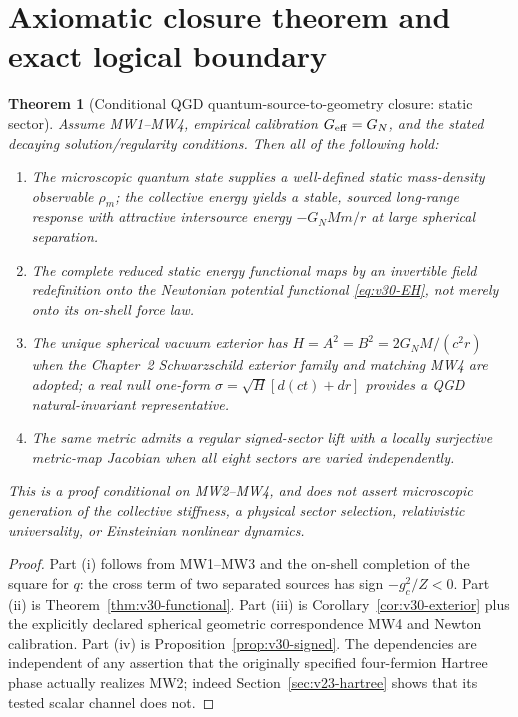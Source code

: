 \documentclass[11pt,a4paper]{article}
\newtheorem{theorem}{Theorem}[section]
\theoremstyle{remark}\newtheorem{remark}[theorem]{Remark}
\begin{document}
\section{Axiomatic closure theorem and exact logical boundary}\label{sec:v30-closure}
\begin{theorem}[Conditional QGD quantum-source-to-geometry closure: static sector]\label{thm:v30-closure}
Assume MW1--MW4, empirical calibration $G_{\rm eff}=G_N$, and the stated decaying solution/regularity conditions. Then all of the following hold:\par
\begin{enumerate}[label=(\roman*)]
\item The microscopic quantum state supplies a well-defined static mass-density observable $\rho_m$; the collective energy yields a stable, sourced long-range response with attractive intersource energy $-G_NMm/r$ at large spherical separation.
\item The complete reduced static energy functional maps by an invertible field redefinition onto the Newtonian potential functional \eqref{eq:v30-EH}, not merely onto its on-shell force law.
\item The unique spherical vacuum exterior has $H=A^2=B^2=2G_NM/(c^2r)$ \emph{when the Chapter~2 Schwarzschild exterior family and matching MW4 are adopted}; a real null one-form $\sigma=\sqrt H[d(ct)+dr]$ provides a QGD natural-invariant representative.
\item The same metric admits a regular signed-sector lift with a locally surjective metric-map Jacobian when all eight sectors are varied independently.
\end{enumerate}
This is a \emph{proof conditional on MW2--MW4}, and does not assert microscopic generation of the collective stiffness, a physical sector selection, relativistic universality, or Einsteinian nonlinear dynamics.
\end{theorem}
\begin{proof}
Part (i) follows from MW1--MW3 and the on-shell completion of the square for $q$: the cross term of two separated sources has sign $-g_c^2/Z<0$. Part (ii) is Theorem~\ref{thm:v30-functional}. Part (iii) is Corollary~\ref{cor:v30-exterior} plus the explicitly declared spherical geometric correspondence MW4 and Newton calibration. Part (iv) is Proposition~\ref{prop:v30-signed}. The dependencies are independent of any assertion that the originally specified four-fermion Hartree phase actually realizes MW2; indeed Section~\ref{sec:v23-hartree} shows that its tested scalar channel does not.\end{proof}
\end{document}
